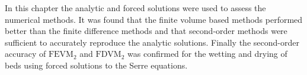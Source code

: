 \medskip
In this chapter the analytic and forced solutions were used to assess the numerical methods. It was found that the finite volume based methods performed better than the finite difference methods and that second-order methods were sufficient to accurately reproduce the analytic solutions. Finally the second-order accuracy of $\text{FEVM}_2$ and $\text{FDVM}_2$ was confirmed for the wetting and drying of beds using forced solutions to the Serre equations.
